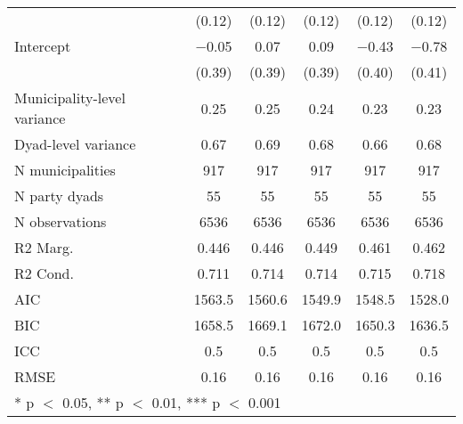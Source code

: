 \begin{tabular}[t]{lccccc}
& (\num{0.12})   & (\num{0.12})   & (\num{0.12})   & (\num{0.12})   & (\num{0.12})   \\
Intercept                            & \num{-0.05}    & \num{0.07}     & \num{0.09}     & \num{-0.43}    & \num{-0.78}   \\
& (\num{0.39})   & (\num{0.39})   & (\num{0.39})   & (\num{0.40})   & (\num{0.41})   \\
\midrule
Municipality-level variance             & \num{0.25}     & \num{0.25}     & \num{0.24}     & \num{0.23}     & \num{0.23}     \\
Dyad-level variance                     & \num{0.67}     & \num{0.69}     & \num{0.68}     & \num{0.66}     & \num{0.68}     \\
N municipalities                        & \num{917}   & \num{917}   & \num{917}   & \num{917}   & \num{917}   \\
N party dyads                           & \num{55}    & \num{55}    & \num{55}    & \num{55}    & \num{55}    \\
N observations                          & \num{6536}     & \num{6536}     & \num{6536}     & \num{6536}     & \num{6536}     \\
R2 Marg.                                & \num{0.446}    & \num{0.446}    & \num{0.449}    & \num{0.461}    & \num{0.462}    \\
R2 Cond.                                & \num{0.711}    & \num{0.714}    & \num{0.714}    & \num{0.715}    & \num{0.718}    \\
AIC                                     & \num{1563.5}   & \num{1560.6}   & \num{1549.9}   & \num{1548.5}   & \num{1528.0}   \\
BIC                                     & \num{1658.5}   & \num{1669.1}   & \num{1672.0}   & \num{1650.3}   & \num{1636.5}   \\
ICC                                     & \num{0.5}      & \num{0.5}      & \num{0.5}      & \num{0.5}      & \num{0.5}      \\
RMSE                                    & \num{0.16}     & \num{0.16}     & \num{0.16}     & \num{0.16}     & \num{0.16}     \\
\bottomrule
\multicolumn{6}{l}{\rule{0pt}{1em}* p $<$ 0.05, ** p $<$ 0.01, *** p $<$ 0.001}\\
\end{tabular}
